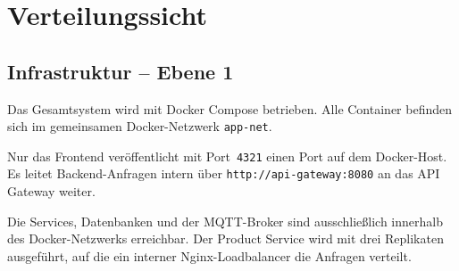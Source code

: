 \section{Verteilungssicht}

\subsection{Infrastruktur -- Ebene 1}

Das Gesamtsystem wird mit Docker Compose betrieben. Alle Container befinden
sich im gemeinsamen Docker-Netzwerk \texttt{app-net}.

Nur das Frontend veröffentlicht mit Port~\texttt{4321} einen Port auf dem
Docker-Host. Es leitet Backend-Anfragen intern über
\texttt{http://api-gateway:8080} an das API Gateway weiter.

Die Services, Datenbanken und der MQTT-Broker sind ausschließlich innerhalb
des Docker-Netzwerks erreichbar. Der Product Service wird mit drei Replikaten
ausgeführt, auf die ein interner Nginx-Loadbalancer die Anfragen verteilt.
